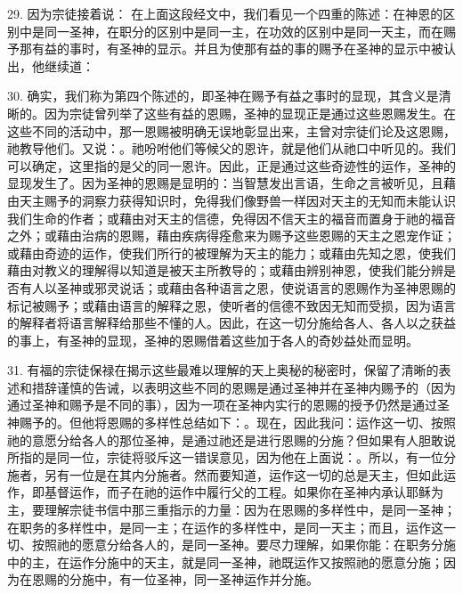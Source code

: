 29. 因为宗徒接着说： 在上面这段经文中，我们看见一个四重的陈述：在神恩的区别中是同一圣神，在职分的区别中是同一主，在功效的区别中是同一天主，而在赐予那有益的事时，有圣神的显示。并且为使那有益的事的赐予在圣神的显示中被认出，他继续道：\par

30. 确实，我们称为第四个陈述的，即圣神在赐予有益之事时的显现，其含义是清晰的。因为宗徒曾列举了这些有益的恩赐，圣神的显现正是通过这些恩赐发生。在这些不同的活动中，那一恩赐被明确无误地彰显出来，主曾对宗徒们论及这恩赐，祂教导他们。又说：。祂吩咐他们等候父的恩许，就是他们从祂口中听见的。我们可以确定，这里指的是父的同一恩许。因此，正是通过这些奇迹性的运作，圣神的显现发生了。因为圣神的恩赐是显明的：当智慧发出言语，生命之言被听见，且藉由天主赐予的洞察力获得知识时，免得我们像野兽一样因对天主的无知而未能认识我们生命的作者；或藉由对天主的信德，免得因不信天主的福音而置身于祂的福音之外；或藉由治病的恩赐，藉由疾病得痊愈来为赐予这些恩赐的天主之恩宠作证；或藉由奇迹的运作，使我们所行的被理解为天主的能力；或藉由先知之恩，使我们藉由对教义的理解得以知道是被天主所教导的；或藉由辨别神恩，使我们能分辨是否有人以圣神或邪灵说话；或藉由各种语言之恩，使说语言的恩赐作为圣神恩赐的标记被赐予；或藉由语言的解释之恩，使听者的信德不致因无知而受损，因为语言的解释者将语言解释给那些不懂的人。因此，在这一切分施给各人、各人以之获益的事上，有圣神的显现，圣神的恩赐借着这些加于各人的奇妙益处而显明。\par

31. 有福的宗徒保禄在揭示这些最难以理解的天上奥秘的秘密时，保留了清晰的表述和措辞谨慎的告诫，以表明这些不同的恩赐是通过圣神并在圣神内赐予的（因为通过圣神和赐予是不同的事），因为一项在圣神内实行的恩赐的授予仍然是通过圣神赐予的。但他将恩赐的多样性总结如下：。现在，因此我问：运作这一切、按照祂的意愿分给各人的那位圣神，是通过祂还是进行恩赐的分施？但如果有人胆敢说所指的是同一位，宗徒将驳斥这一错误意见，因为他在上面说：。所以，有一位分施者，另有一位是在其内分施者。然而要知道，运作这一切的总是天主，但如此运作，即基督运作，而子在祂的运作中履行父的工程。如果你在圣神内承认耶稣为主，要理解宗徒书信中那三重指示的力量：因为在恩赐的多样性中，是同一圣神；在职务的多样性中，是同一主；在运作的多样性中，是同一天主；而且，运作这一切、按照祂的愿意分给各人的，是同一圣神。要尽力理解，如果你能：在职务分施中的主，在运作分施中的天主，就是同一圣神，祂既运作又按照祂的愿意分施；因为在恩赐的分施中，有一位圣神，同一圣神运作并分施。\par

